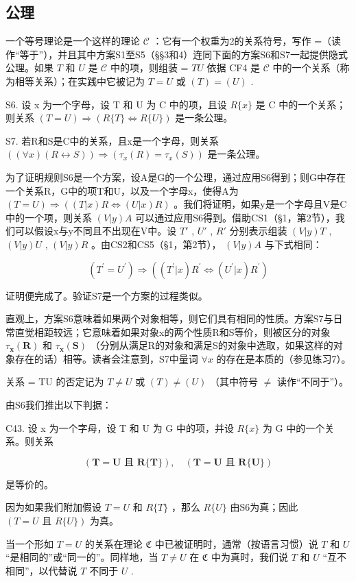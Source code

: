 \subsection{公理}

一个等号理论是一个这样的理论 \(\mathcal{C}\) ：它有一个权重为2的关系符号，写作 =（读作“等于”），并且其中方案S1至S5（§§3和4）连同下面的方案S6和S7一起提供隐式公理。如果 \(T\) 和 \(U\) 是 \(\mathcal{C}\) 中的项，则组装 = \(TU\) 依据 CF4 是 \(\mathcal{C}\) 中的一个关系（称为相等关系）；在实践中它被记为 \(T = U\) 或 \((T) = (U)\) .

S6. 设 x 为一个字母，设 T 和 U 为 C 中的项，且设 \(R\{x\}\) 是 C 中的一个关系；则关系 \((T = U) \Longrightarrow (R\{T\} \Longleftrightarrow R\{U\})\) 是一条公理。

S7. 若R和S是C中的关系，且x是一个字母，则关系 \(((\forall x)(R \leftrightarrow S)) \Longrightarrow (\tau_{x}(R) = \tau_{x}(S))\) 是一条公理。

为了证明规则S6是一个方案，设A是G的一个公理，通过应用S6得到；则G中存在一个关系R，G中的项T和U，以及一个字母x，使得A为 \((T=U)\Longrightarrow((T|x)R\Longleftrightarrow(U|x)R)\) 。我们将证明，如果y是一个字母且V是C中的一个项，则关系 \((V|y)A\) 可以通过应用S6得到。借助CS1（§1，第2节），我们可以假设x与y不同且不出现在V中。设 \(T'\) , \(U'\) , \(R'\) 分别表示组装 \((V|y)T\) , \((V|y)U\) , \((V|y)R\) 。由CS2和CS5（§1，第2节）， \((V|y)A\) 与下式相同：

\[
(T ^ {\prime} = U ^ {\prime}) \Longrightarrow ((T ^ {\prime} | x) R ^ {\prime} \Longleftrightarrow (U ^ {\prime} | x) R ^ {\prime})
\]

证明便完成了。验证S7是一个方案的过程类似。

直观上，方案S6意味着如果两个对象相等，则它们具有相同的性质。方案S7与日常直觉相距较远；它意味着如果对象x的两个性质R和S等价，则被区分的对象 \(\tau_{\mathbf{x}}(\mathbf{R})\) 和 \(\tau_{\mathbf{x}}(\mathbf{S})\) （分别从满足R的对象和满足S的对象中选取，如果这样的对象存在的话）相等。读者会注意到，S7中量词 \(\forall x\) 的存在是本质的（参见练习7）。

关系 = TU 的否定记为 \(T \neq U\) 或 \((T) \neq (U)\) （其中符号 \(\neq\) 读作“不同于”）。

由S6我们推出以下判据：

C43. 设 x 为一个字母，设 T 和 U 为 G 中的项，并设 \(R\{x\}\) 为 G 中的一个关系。则关系

\[
(\boldsymbol {T} = \boldsymbol {U} \text {   且   } \boldsymbol {R} \{\boldsymbol {T} \}), \quad (\boldsymbol {T} = \boldsymbol {U} \text {   且   } \boldsymbol {R} \{\boldsymbol {U} \})
\]

是等价的。

因为如果我们附加假设 \(T = U\) 和 \(R\{T\}\) ，那么 \(R\{U\}\) 由S6为真；因此 \((T = U \text{ 且 } R\{U\})\) 为真。

当一个形如 \(T = U\) 的关系在理论 \(\mathfrak{C}\) 中已被证明时，通常（按语言习惯）说 \(T\) 和 \(U\) “是相同的”或“同一的”。同样地，当 \(T \neq U\) 在 \(\mathfrak{C}\) 中为真时，我们说 \(T\) 和 \(U\) “互不相同”，以代替说 \(T\) 不同于 \(U\) .


